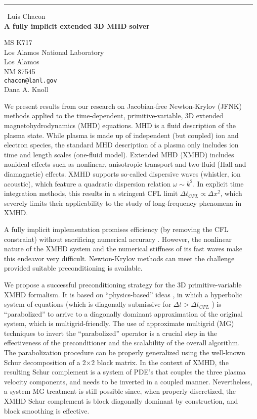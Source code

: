 \documentclass{report}
\begin{document}
\begin{center}
\rule{6in}{1pt} \
{\large Luis Chacon \\
{\bf A fully implicit extended 3D MHD solver}}

MS K717 \\ Los Alamos National Laboratory \\ Los Alamos \\ NM 87545
\\
{\tt chacon@lanl.gov}\\
Dana A. Knoll\end{center}

We present results from our research on Jacobian-free Newton-Krylov
(JFNK) methods applied to the time-dependent, primitive-variable,
3D extended magnetohydrodynamics (MHD) equations. MHD is a fluid description
of the plasma state. While plasma is made up of independent (but coupled)
ion and electron species, the standard MHD description of a plasma
only includes ion time and length scales (one-fluid model). Extended
MHD (XMHD) includes nonideal effects such as nonlinear, anisotropic
transport and two-fluid (Hall and diamagnetic) effects. XMHD supports
so-called dispersive waves (whistler, ion acoustic), which feature
a quadratic dispersion relation $\omega \sim k^{2}$. In explicit
time integration methods, this results in a stringent CFL limit $\Delta
t_{CFL}\propto \Delta x^{2}$,
which severely limits their applicability to the study of long-frequency
phenomena in XMHD.

A fully implicit implementation promises efficiency (by removing the
CFL constraint) without sacrificing numerical accuracy \cite{knoll-jcp-03}.
However, the nonlinear nature of the XMHD system and the numerical
stiffness of its fast waves make this endeavor very difficult. Newton-Krylov
methods can meet the challenge provided suitable preconditioning is
available.

We propose a successful preconditioning strategy for the 3D primitive-variable
XMHD formalism. It is based on {}``physics-based'' ideas
\cite{chacon-jcp-02,chacon-jcp-03},
in which a hyperbolic system of equations (which is diagonally submissive
for $\Delta t>\Delta t_{CFL}$ \cite{chacon-jcp-02}) is {}``parabolized''
to arrive to a diagonally dominant approximation of the original system,
which is multigrid-friendly. The use of approximate multigrid (MG)
techniques to invert the {}``parabolized'' operator is a crucial
step in the effectiveness of the preconditioner and the scalability
of the overall algorithm. The parabolization procedure can be properly
generalized using the well-known Schur decomposition of a 2$\times $2
block matrix. In the context of XMHD, the resulting Schur complement
is a system of PDE's that couples the three plasma velocity components,
and needs to be inverted in a coupled manner. Nevertheless, a system
MG treatment is still possible since, when properly discretized, the
XMHD Schur complement is block diagonally dominant by construction,
and block smoothing is effective.
\end{document}
